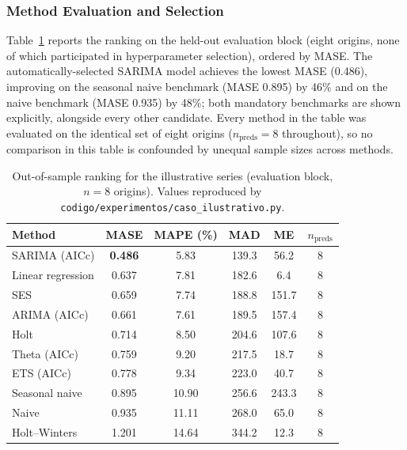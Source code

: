 \documentclass[forecasting,article,submit,pdftex,moreauthors]{Definitions/mdpi}
\begin{document}
\subsubsection{Method Evaluation and Selection}

Table~\ref{tab:rankingcaso} reports the ranking on the held-out evaluation block (eight origins, none of which participated in hyperparameter selection), ordered by MASE. The automatically-selected SARIMA model achieves the lowest MASE (0.486), improving on the seasonal naive benchmark (MASE 0.895) by 46\% and on the naive benchmark (MASE 0.935) by 48\%; both mandatory benchmarks are shown explicitly, alongside every other candidate. Every method in the table was evaluated on the identical set of eight origins ($n_{\text{preds}}=8$ throughout), so no comparison in this table is confounded by unequal sample sizes across methods.

\begin{table}[H]
\caption{Out-of-sample ranking for the illustrative series (evaluation block, $n=8$ origins). Values reproduced by \texttt{codigo/\allowbreak experimentos/\allowbreak caso\_\allowbreak ilustrativo.py}.\label{tab:rankingcaso}}
\centering
\begin{tabularx}{\textwidth}{Xccccc}
\toprule
\textbf{Method} & \textbf{MASE} & \textbf{MAPE (\%)} & \textbf{MAD} & \textbf{ME} & \textbf{$n_{\text{preds}}$} \\
\midrule
SARIMA (AICc)               & \textbf{0.486} & 5.83  & 139.3 & 56.2  & 8 \\
Linear regression            & 0.637 & 7.81  & 182.6 & 6.4   & 8 \\
SES                           & 0.659 & 7.74  & 188.8 & 151.7 & 8 \\
ARIMA (AICc)                  & 0.661 & 7.61  & 189.5 & 157.4 & 8 \\
Holt                          & 0.714 & 8.50  & 204.6 & 107.6 & 8 \\
Theta (AICc)                  & 0.759 & 9.20  & 217.5 & 18.7  & 8 \\
ETS (AICc)                    & 0.778 & 9.34  & 223.0 & 40.7  & 8 \\
Seasonal naive                & 0.895 & 10.90 & 256.6 & 243.3 & 8 \\
Naive                         & 0.935 & 11.11 & 268.0 & 65.0  & 8 \\
Holt--Winters                 & 1.201 & 14.64 & 344.2 & 12.3  & 8 \\
\bottomrule
\end{tabularx}
\end{table}
\end{document}
